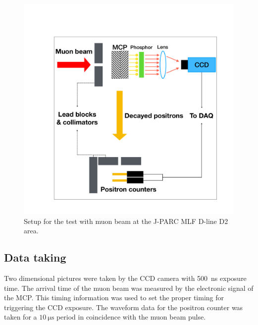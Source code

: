 \documentclass[preprint,3p,twocolumn]{elsarticle}
\begin{document}
\begin{figure}[tb]
{\setlength{\belowdisplayskip}{0pt}
\begin{minipage}[t]{60mm}
\includegraphics[width=1.25\textwidth, height=1.25\textwidth]{figure/BPM_schematic_2.pdf}
\end{minipage}
}
\caption{Setup for the test with muon beam at the J-PARC MLF D-line D2
  area.}
\vspace{-0.4cm}
\label{fig:simulation}
\end{figure}

\subsection{Data taking} 

Two dimensional pictures were taken by the CCD camera with
\SI{500}{\nano\s} exposure time.  The arrival time of the muon
beam was measured by the electronic signal of the MCP. This timing
information was used to set the proper timing for triggering the
CCD exposure. The waveform data for the positron counter was
taken for a $\SI{10}{\micro\s}$ period in coincidence with the
muon beam pulse.
\end{document}

